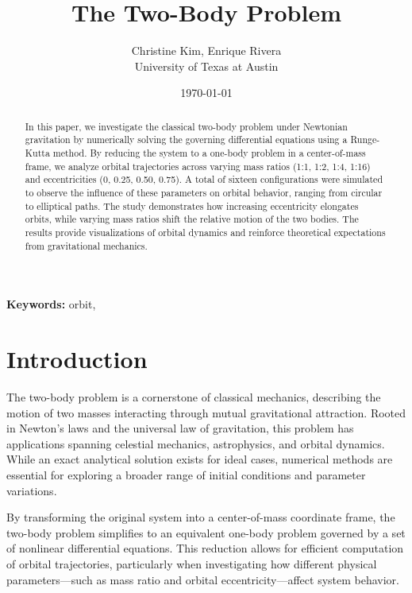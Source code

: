 \documentclass{article}
\title{\textbf{The Two-Body Problem}}
\author{Christine Kim, Enrique Rivera \\ University of Texas at Austin}
\date{\today}
\begin{document}
\maketitle

\begin{abstract}
In this paper, we investigate the classical two-body problem under Newtonian gravitation by numerically solving the governing differential equations using a Runge-Kutta method. By reducing the system to a one-body problem in a center-of-mass frame, we analyze orbital trajectories across varying mass ratios (1:1, 1:2, 1:4, 1:16) and eccentricities (0, 0.25, 0.50, 0.75). A total of sixteen configurations were simulated to observe the influence of these parameters on orbital behavior, ranging from circular to elliptical paths. The study demonstrates how increasing eccentricity elongates orbits, while varying mass ratios shift the relative motion of the two bodies. The results provide visualizations of orbital dynamics and reinforce theoretical expectations from gravitational mechanics.
\end{abstract}

\textbf{Keywords:} orbit,

\section{Introduction}
The two-body problem is a cornerstone of classical mechanics, describing the motion of two masses interacting through mutual gravitational attraction. Rooted in Newton’s laws and the universal law of gravitation, this problem has applications spanning celestial mechanics, astrophysics, and orbital dynamics. While an exact analytical solution exists for ideal cases, numerical methods are essential for exploring a broader range of initial conditions and parameter variations.

By transforming the original system into a center-of-mass coordinate frame, the two-body problem simplifies to an equivalent one-body problem governed by a set of nonlinear differential equations. This reduction allows for efficient computation of orbital trajectories, particularly when investigating how different physical parameters—such as mass ratio and orbital eccentricity—affect system behavior.
\end{document}
